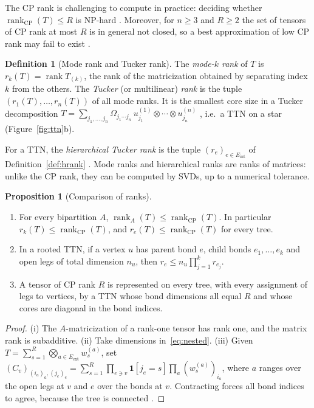 \documentclass[11pt]{article}
\newcommand{\rank}{\operatorname{rank}}
\newcommand{\rankcp}{\operatorname{rank}_{\mathrm{CP}}}
\newcommand{\Eint}{E_{\mathrm{int}}}
\newcommand{\Eext}{E_{\mathrm{ext}}}
\theoremstyle{definition}
\newtheorem{proposition}[theorem]{Proposition}
\newtheorem{definition}[theorem]{Definition}
\numberwithin{equation}{section}
\begin{document}
The CP rank is challenging to compute in practice: deciding whether $\rankcp(T)\le R$ is NP-hard \citep{hastad1990tensor,hillar2013most}. Moreover, for $n\ge3$ and $R\ge2$ the set of tensors of CP rank at most $R$ is in general not closed, so a best approximation of low CP rank may fail to exist \citep{desilva2008tensor}.

\begin{definition}[Mode rank and Tucker rank]
The \emph{mode-$k$ rank} of $T$ is $r_k(T)=\rank T_{(k)}$, the rank of the matricization obtained by separating index $k$ from the others. The \emph{Tucker} (or multilinear) \emph{rank} is the tuple $(r_1(T),\dots,r_n(T))$ of all mode ranks. It is the smallest core size in a Tucker decomposition $T=\sum_{j_1,\dots,j_n}\Omega_{j_1\cdots j_n}\,u^{(1)}_{j_1}\otimes\cdots\otimes u^{(n)}_{j_n}$ \citep{tucker1966some,delathauwer2000multilinear}, i.e.\ a TTN on a star (Figure~\ref{fig:ttn}b).
\end{definition}

For a TTN, the \emph{hierarchical Tucker rank} is the tuple $(r_e)_{e\in\Eint}$ of Definition~\ref{def:hrank} \citep{hackbusch2009new,grasedyck2010hierarchical}. Mode ranks and hierarchical ranks are ranks of matrices: unlike the CP rank, they can be computed by SVDs, up to a numerical tolerance.

\begin{proposition}[Comparison of ranks]\label{prop:rank-comparison}
\leavevmode
\begin{enumerate}[label=(\roman*),nosep]
\item For every bipartition $A$, $\rank_A(T)\le\rankcp(T)$. In particular $r_k(T)\le\rankcp(T)$, and $r_e(T)\le\rankcp(T)$ for every tree.
\item In a rooted TTN, if a vertex $u$ has parent bond $e$, child bonds $e_1,\dots,e_k$ and open legs of total dimension $n_u$, then $r_e\le n_u\prod_{j=1}^kr_{e_j}$.
\item A tensor of CP rank $R$ is represented on every tree, with every assignment of legs to vertices, by a TTN whose bond dimensions all equal $R$ and whose cores are diagonal in the bond indices.
\end{enumerate}
\end{proposition}

\begin{proof}
(i) The $A$-matricization of a rank-one tensor has rank one, and the matrix rank is subadditive. (ii) Take dimensions in~\eqref{eq:nested}. (iii) Given $T=\sum_{s=1}^R\bigotimes_{a\in\Eext}w_s^{(a)}$, set $(C_v)_{(i_a)_{a},(j_e)_{e}}=\sum_{s=1}^R\prod_{e\ni v}\mathbf 1[j_e=s]\prod_{a}(w_s^{(a)})_{i_a}$, where $a$ ranges over the open legs at $v$ and $e$ over the bonds at $v$. Contracting forces all bond indices to agree, because the tree is connected \citep[Section~2.4]{hfl_diagonal}.
\end{proof}
\end{document}
